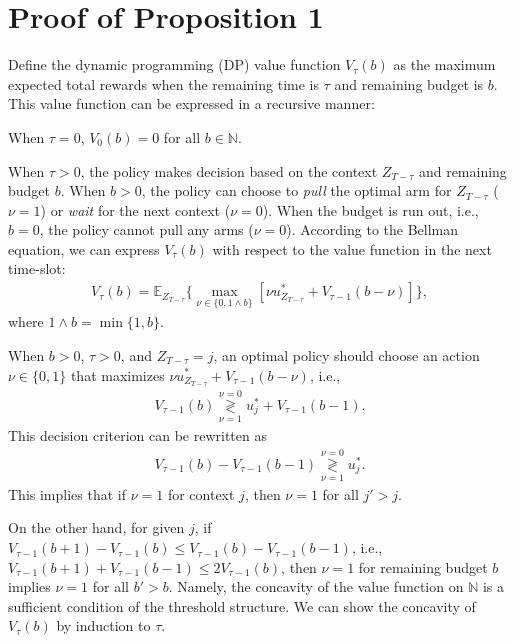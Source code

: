 \appendices

\section{Proof of Proposition 1}\label{app:proof_opt_threshold_struct}
Define the dynamic programming (DP) value function $V_{\tau}(b)$ as the maximum expected total rewards when the remaining time is $\tau$ and remaining budget is $b$. This value function can be expressed in a recursive manner:

When $\tau = 0$, $V_0(b) = 0$ for all $b \in \mathbb{N}$.

When $\tau > 0$, the policy makes decision based on the context $Z_{T-\tau}$ and remaining budget $b$. When $b > 0$, the policy can choose to {\it pull} the optimal arm for $Z_{T-\tau}$ ($\nu = 1$) or {\it wait} for the next context ($\nu = 0$). When the  budget is run out, i.e., $b= 0$, the policy cannot pull any arms ($\nu = 0$).   According to the Bellman equation, we can express $V_{\tau}(b)$ with respect to the value function in the next time-slot:
\begin{eqnarray}
V_{\tau}(b) = \mathbb{E}_{Z_{T - \tau}}\big\{\max_{\nu \in \{0, 1\land b\}} [\nu u_{Z_{T - \tau}}^* + V_{\tau-1}(b - \nu)] \big\},
\end{eqnarray}
where $1 \land b = \min\{1,b\}$.

When $b > 0$, $\tau > 0$, and $Z_{T- \tau} = j$, an optimal policy should choose an action $\nu \in \{0, 1\}$ that maximizes $\nu u_{Z_{T - \tau}}^* + V_{\tau-1}(b - \nu)$, i.e.,
\begin{eqnarray}
V_{\tau -1}(b) \underset{\nu = 1}{\overset{\nu = 0}{\gtrless}} u_j^* + V_{\tau-1}(b - 1).
\end{eqnarray}
This decision criterion can be rewritten as
\begin{eqnarray}
V_{\tau-1}(b) - V_{\tau-1}(b - 1)\underset{\nu = 1}{\overset{\nu = 0}{\gtrless}} u_j^*.
\end{eqnarray}
This implies that if $\nu = 1$ for context $j$, then $\nu = 1$ for all $j' > j$.

On the other hand, for given $j$, if $V_{\tau-1}(b+1) - V_{\tau-1}(b) \leq V_{\tau-1}(b) - V_{\tau-1}(b - 1)$, i.e., $V_{\tau-1}(b+1) + V_{\tau-1}(b - 1) \leq 2V_{\tau-1}(b)$, then  $\nu = 1$ for remaining budget $b$ implies $\nu = 1$ for all $b' > b$. Namely, the concavity of the value function on $\mathbb{N}$ is a sufficient condition of the threshold structure. We can show the concavity of $V_{\tau}(b)$ by induction to $\tau$.

